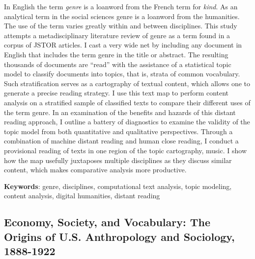 \documentclass[]{book}
\theoremstyle{definition}
\theoremstyle{definition}
\theoremstyle{definition}
\theoremstyle{remark}
\begin{document}
In English the term \emph{genre} is a loanword from the
French term for \emph{kind}. As an analytical term in the social
sciences genre is a loanword from the humanities. The use of the term
varies greatly within and between disciplines. This study attempts a
metadisciplinary literature review of genre as a term found in a corpus
of JSTOR articles. I cast a very wide net by including any document in
English that includes the term genre in the title or abstract. The
resulting thousands of documents are ``read'' with the assistance of a
statistical topic model to classify documents into topics, that is,
strata of common vocabulary. Such stratification serves as a cartography
of textual content, which allows one to generate a precise reading
strategy. I use this text map to perform content analysis on a
stratified sample of classified texts to compare their different uses of
the term genre. In an examination of the benefits and hazards of this
distant reading approach, I outline a battery of diagnostics to examine
the validity of the topic model from both quantitative and qualitative
perspectives. Through a combination of machine distant reading and human
close reading, I conduct a provisional reading of texts in one region of
the topic cartography, music. I show how the map usefully juxtaposes
multiple disciplines as they discuss similar content, which makes
comparative analysis more productive.




\textbf{Keywords}: genre, disciplines, computational text analysis, topic
modeling, content analysis, digital humanities, distant reading

\hypertarget{economy-society-and-vocabulary-the-origins-of-u.s.-anthropology-and-sociology-1888-1922}{%
\subsection{Economy, Society, and Vocabulary: The Origins of U.S.
Anthropology and Sociology,
1888-1922}\label{economy-society-and-vocabulary-the-origins-of-u.s.-anthropology-and-sociology-1888-1922}}
\end{document}
